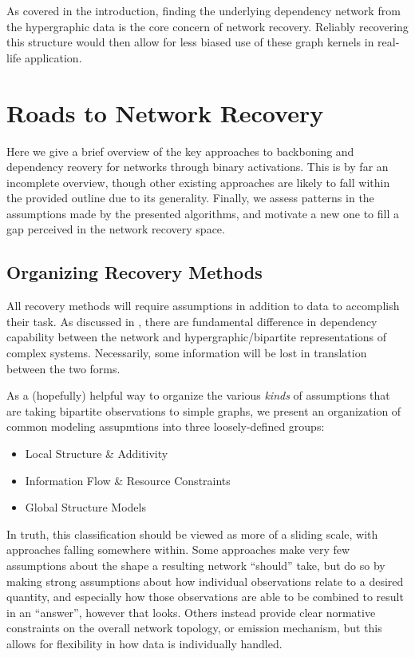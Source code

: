 \documentclass[%
	12pt,
		oneside,
		letterpaper
]{book}
\providecommand{\tightlist}{%
  \setlength{\itemsep}{0pt}\setlength{\parskip}{0pt}}\usepackage{longtable,booktabs,array}
\begin{document}
As covered in the introduction, finding the underlying dependency
network from the hypergraphic data is the core concern of network
recovery. Reliably recovering this structure would then allow for less
biased use of these graph kernels in real-life application.

\chapter{Roads to Network Recovery}\label{sec-lit-review}

Here we give a brief overview of the key approaches to backboning and
dependency reovery for networks through binary activations. This is by
far an incomplete overview, though other existing approaches are likely
to fall within the provided outline due to its generality. Finally, we
assess patterns in the assumptions made by the presented algorithms, and
motivate a new one to fill a gap perceived in the network recovery
space.

\section{Organizing Recovery Methods}\label{organizing-recovery-methods}

All recovery methods will require assumptions in addition to data to
accomplish their task. As discussed in \textcite{WhyHowWhen_Torres2021},
there are fundamental difference in dependency capability between the
network and hypergraphic/bipartite representations of complex systems.
Necessarily, some information will be lost in translation between the
two forms.

As a (hopefully) helpful way to organize the various \emph{kinds} of
assumptions that are taking bipartite observations to simple graphs, we
present an organization of common modeling assupmtions into three
loosely-defined groups:

\begin{itemize}
\tightlist
\item
  Local Structure \& Additivity
\item
  Information Flow \& Resource Constraints
\item
  Global Structure Models
\end{itemize}

In truth, this classification should be viewed as more of a sliding
scale, with approaches falling somewhere within. Some approaches make
very few assumptions about the shape a resulting network ``should''
take, but do so by making strong assumptions about how individual
observations relate to a desired quantity, and especially how those
observations are able to be combined to result in an ``answer'', however
that looks. Others instead provide clear normative constraints on the
overall network topology, or emission mechanism, but this allows for
flexibility in how data is individually handled.
\end{document}
